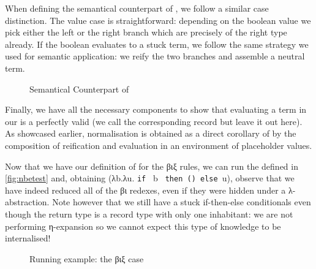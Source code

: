 When defining the semantical counterpart of , we follow a similar
case distinction.
%
The value case is straightforward: depending on the boolean value we
pick either the left or the right branch which are precisely of the right
type already.
%
If the boolean evaluates to a stuck term, we follow the same strategy we
used for semantic application: we reify the two branches and assemble a
neutral term.

\begin{figure}[h]
\caption{Semantical Counterpart of }
\end{figure}

Finally, we have all the necessary components to show that evaluating
a term in our  is a perfectly valid  (we call
the corresponding  record  but leave it out here).
%
As showcased earlier, normalisation is obtained as a direct corollary of
 by the composition of reification and evaluation in an environment
of placeholder values.


Now that we have our definition of  for the βιξ rules, we
can run the  defined in \cref{fig:nbetest} and, obtaining
(λb.λu. \texttt{if~} b \texttt{~then~()~else~}u),
observe that
we have indeed reduced all of the βι redexes, even if they were
hidden under a λ-abstraction. Note however that we still have a stuck
if-then-else conditionals even though the return type is a record type
with only one inhabitant: we are not performing η-expansion so we cannot
expect this type of knowledge to be internalised!

\begin{figure}[h]
\caption{Running example: the βιξ case}\label{fig:betaiotaxitest}
\end{figure}
